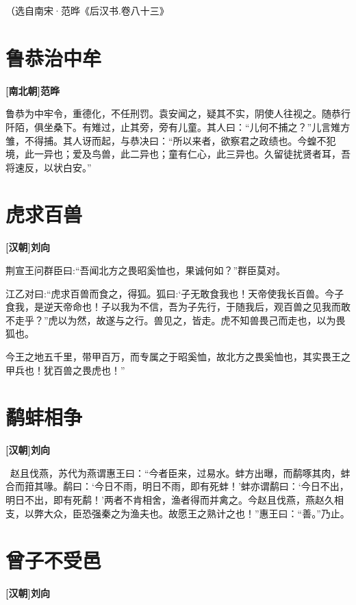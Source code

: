 \documentclass[UTF8,titlepage,oneside]{ctexbook}
\begin{document}
（选自南宋·范晔《后汉书.卷八十三》



\chapter*{鲁恭治中牟}
\begin{center}
	\textbf{[南北朝]范晔}
\end{center}


鲁恭为中牢令，重德化，不任刑罚。袁安闻之，疑其不实，阴使人往视之。随恭行阡陌，俱坐桑下。有雉过，止其旁，旁有儿童。其人曰：“儿何不捕之？”儿言雉方雏，不得捕。其人讶而起，与恭决曰：“所以来者，欲察君之政绩也。今蝗不犯境，此一异也；爱及鸟兽，此二异也；童有仁心，此三异也。久留徒扰贤者耳，吾将速反，以状白安。”

\chapter*{虎求百兽}
\begin{center}
	\textbf{[汉朝]刘向}
\end{center}


荆宣王问群臣曰:“吾闻北方之畏昭奚恤也，果诚何如？”群臣莫对。

江乙对曰:“虎求百兽而食之，得狐。狐曰:‘子无敢食我也！天帝使我长百兽。今子食我，是逆天帝命也！子以我为不信，吾为子先行，于随我后，观百兽之见我而敢不走乎？”虎以为然，故遂与之行。兽见之，皆走。虎不知兽畏己而走也，以为畏狐也。

今王之地五千里，带甲百万，而专属之于昭奚恤，故北方之畏奚恤也，其实畏王之甲兵也！犹百兽之畏虎也！”

\chapter*{鹬蚌相争}
\begin{center}
	\textbf{[汉朝]刘向}
\end{center}


 赵且伐燕，苏代为燕谓惠王曰：“今者臣来，过易水。蚌方出曝，而鹬啄其肉，蚌合而箝其喙。鹬曰：‘今日不雨，明日不雨，即有死蚌！’蚌亦谓鹬曰：‘今日不出，明日不出，即有死鹬！’两者不肯相舍，渔者得而并禽之。今赵且伐燕，燕赵久相支，以弊大众，臣恐强秦之为渔夫也。故愿王之熟计之也！”惠王曰：“善。”乃止。


\chapter*{曾子不受邑}
\begin{center}
	\textbf{[汉朝]刘向}
\end{center}
\end{document}

